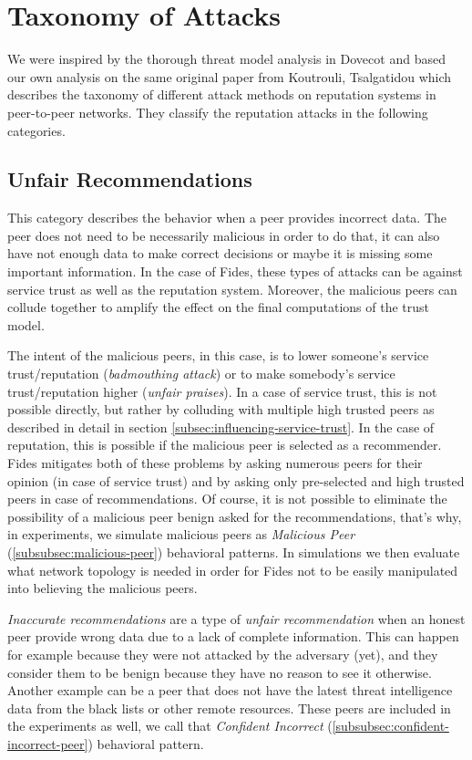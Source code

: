 \section{Taxonomy of Attacks}
\label{sec:taxonomy-of-attacks}
We were inspired by the thorough threat model analysis in Dovecot \cite{dita}  and based our own analysis on the same original paper from Koutrouli, Tsalgatidou \cite{KOUTROULI201247} which describes the taxonomy of different attack methods on reputation systems in peer-to-peer networks.
They classify the reputation attacks in the following categories.

\subsection{Unfair Recommendations}
\label{subsec:unfair-recommendations}
This category describes the behavior when a peer provides incorrect data.
The peer does not need to be necessarily malicious in order to do that, it can also have not enough data to make correct decisions or maybe it is missing some important information.
In the case of Fides, these types of attacks can be against service trust as well as the reputation system.
Moreover, the malicious peers can collude together to amplify the effect on the final computations of the trust model.

The intent of the malicious peers, in this case, is to lower someone's service trust/reputation (\textit{badmouthing attack}) or to make somebody's service trust/reputation higher (\textit{unfair praises}).
In a case of service trust, this is not possible directly, but rather by colluding with multiple high trusted peers as described in detail in section \ref{subsec:influencing-service-trust}.
In the case of reputation, this is possible if the malicious peer is selected as a recommender.
Fides mitigates both of these problems by asking numerous peers for their opinion (in case of service trust) and by asking only pre-selected and high trusted peers in case of recommendations.
Of course, it is not possible to eliminate the possibility of a malicious peer benign asked for the recommendations, that's why, in experiments, we simulate malicious peers as \textit{Malicious Peer} (\ref{subsubsec:malicious-peer}) behavioral patterns.
In simulations we then evaluate what network topology is needed in order for Fides not to be easily manipulated into believing the malicious peers.

\textit{Inaccurate recommendations} are a type of \textit{unfair recommendation} when an honest peer provide wrong data due to a lack of complete information.
This can happen for example because they were not attacked by the adversary (yet), and they consider them to be benign because they have no reason to see it otherwise.
Another example can be a peer that does not have the latest threat intelligence data from the black lists or other remote resources.
These peers are included in the experiments as well, we call that \textit{Confident Incorrect} (\ref{subsubsec:confident-incorrect-peer}) behavioral pattern.

